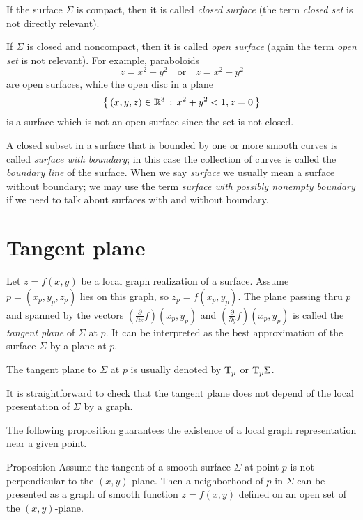 If the surface $\Sigma$ is compact, then it is called \emph{closed surface} (the term \emph{closed set} is not directly relevant).

If $\Sigma$ is closed and noncompact, then it is called  \emph{open surface} (again the term \emph{open set} is not relevant).
For example, paraboloids 
\[z=x^2+y^2\quad\text{or}\quad z=x^2-y^2\]
are open surfaces, while the
open disc in a plane 
\[\left\{\,{(x,y,z)\in\mathbb{R}^3}\,:\,{x^2+y^2<1, z=0}\,\right\}\]
is a surface which is not an open surface since the set is not closed. 

A closed subset in a surface that is bounded by one or more smooth curves is called \emph{surface with boundary}; in this case the collection of curves is called the \emph{boundary line} of the surface.
When we say \emph{surface} we usually mean a surface without boundary;
we may use the term \emph{surface with possibly nonempty boundary} if we need to talk about surfaces with and without boundary.


\section{Tangent plane}

Let $z=f(x,y)$ be a local graph realization of a surface. 
Assume $p=(x_p,y_p,z_p)$ lies on this graph, so $z_p=f(x_p,y_p)$.
The plane passing thru $p$ and spanned by the vectors $(\tfrac{\partial}{\partial x}f)(x_p,y_p)$ and  $(\tfrac{\partial}{\partial y}f)(x_p,y_p)$ is called the \emph{tangent plane} of $\Sigma$ at $p$.
It can be interpreted as the best approximation of the surface $\Sigma$ by a plane at $p$.

The tangent plane to $\Sigma$ at $p$ is usually denoted by $\mathrm{T}_p$ or $\mathrm{T}_p\Sigma$.

It is straightforward to check that the tangent plane does not depend of the local presentation of $\Sigma$ by a graph.

The following proposition guarantees the existence of a local graph representation near a given point.

\begin{thm}{Proposition}\label{prop:perp}
Assume the tangent of a smooth surface $\Sigma$ at point $p$ is not perpendicular to the $(x,y)$-plane.
Then a neighborhood of $p$ in $\Sigma$ can be presented as a graph of smooth function $z=f(x,y)$ defined on an open set of the $(x,y)$-plane.
\end{thm}

